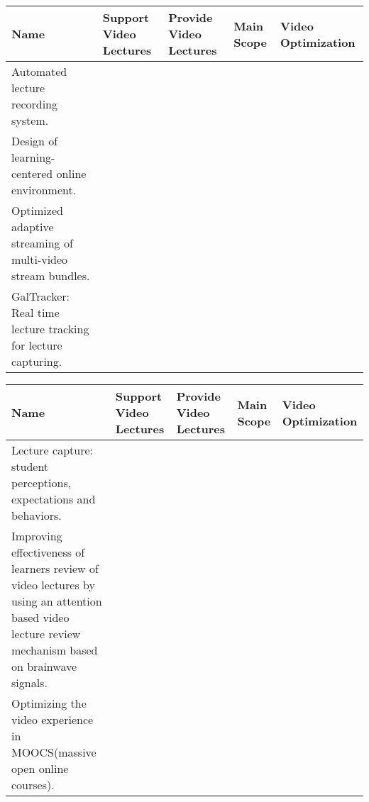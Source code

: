 \begin{sideways}
\centering
\begin{tabularx}{1.5\textwidth} { 
  | >{\raggedright\arraybackslash}X 
  | >{\centering\arraybackslash}X | >{\centering\arraybackslash}X | >{\centering\arraybackslash}X | >{\raggedleft\arraybackslash}X | }
 \hline
\bfseries{Name} & \bfseries{Support Video Lectures} &\bfseries{Provide Video Lectures} &\bfseries{Main Scope} & \bfseries{Video Optimization}  \\
\hline
Automated lecture recording system.\cite{Chou2010}
&
&
&
&
\\
\hline
Design of learning-centered online environment.\cite{Garcia-Cabrero2018}
&
&
&
&
\\
\hline
Optimized adaptive streaming of multi-video stream bundles.\cite{Carlsson2017}
&
&
&
&
\\

\hline
GalTracker: Real time lecture tracking for lecture capturing.\cite{Gonzalez-Agulla2013}
&
&
&
&
\\
\hline

\end{tabularx}
\end{sideways}



\begin{sideways}
\centering
\begin{tabularx}{1.5\textwidth} { 
  | >{\raggedright\arraybackslash}X 
  | >{\centering\arraybackslash}X | >{\centering\arraybackslash}X | >{\centering\arraybackslash}X | >{\raggedleft\arraybackslash}X | }
 \hline
\bfseries{Name} & \bfseries{Support Video Lectures} &\bfseries{Provide Video Lectures} &\bfseries{Main Scope} & \bfseries{Video Optimization}  \\
\hline
Lecture capture: student perceptions, expectations and behaviors.\cite{Barokas2010}
&
&
&
&
\\
\hline
Improving effectiveness of learners review of video lectures by using an attention based video lecture review mechanism  based on brainwave signals.\cite{Lin2019}
&
&
&
&
\\
\hline
Optimizing the video experience in MOOCS(massive open online courses).\cite{Renz2015}
&
&
&
&
\\

\hline
\end{tabularx}
\end{sideways}




